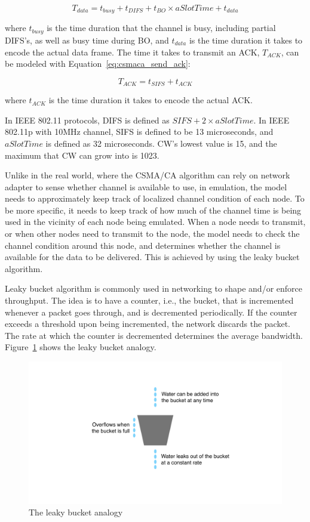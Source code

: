 \documentclass[12pt]{report}
\begin{document}
\begin{equation}
  T_{data}=t_{busy}+t_{DIFS}+t_{BO}\times aSlotTime+t_{data}
  \label{eq:csmaca_send_data}
\end{equation}

where $t_{busy}$ is the time duration that the channel is busy, including partial DIFS's, as well as busy time during BO, and $t_{data}$ is the time duration it takes to encode the actual data frame. The time it takes to transmit an ACK, $T_{ACK}$, can be modeled with Equation~\ref{eq:csmaca_send_ack}:

\begin{equation}
  T_{ACK}=t_{SIFS}+t_{ACK}
  \label{eq:csmaca_send_ack}
\end{equation}

where $t_{ACK}$ is the time duration it takes to encode the actual ACK.

In IEEE 802.11 protocols, DIFS is defined as $SIFS + 2 \times aSlotTime$. In IEEE 802.11p with 10MHz channel, SIFS is defined to be 13 microseconds, and $aSlotTime$ is defined as 32 microseconds. CW's lowest value is 15, and the maximum that CW can grow into is 1023. \cite{ieee201280211macphy}

Unlike in the real world, where the CSMA/CA algorithm can rely on network adapter to sense whether channel is available to use, in emulation, the model needs to approximately keep track of localized channel condition of each node. To be more specific, it needs to keep track of how much of the channel time is being used in the vicinity of each node being emulated. When a node needs to transmit, or when other nodes need to transmit to the node, the model needs to check the channel condition around this node, and determines whether the channel is available for the data to be delivered. This is achieved by using the leaky bucket algorithm.

Leaky bucket algorithm \cite{turner1986,yin1991} is commonly used in networking to shape and/or enforce throughput. The idea is to have a counter, i.e., the bucket, that is incremented whenever a packet goes through, and is decremented periodically. If the counter exceeds a threshold upon being incremented, the network discards the packet. The rate at which the counter is decremented determines the average bandwidth. Figure~\ref{fig:leaky_bucket} shows the leaky bucket analogy.

\begin{figure}[h]
  \begin{center}
    \includegraphics[width=.6\textwidth]{figures/leakyBucket.pdf}
    \caption{\label{fig:leaky_bucket}The leaky bucket analogy}
  \end{center}
\end{figure}
\end{document}
